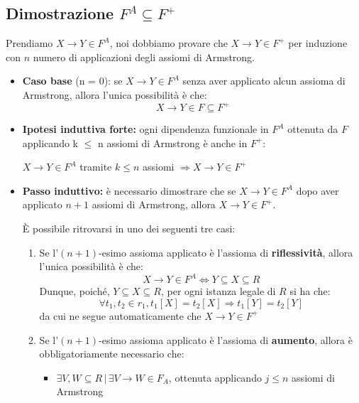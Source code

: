 \documentclass{article}
\begin{document}
\subsection{Dimostrazione $F^{A} \subseteq F^{+}$}
Prendiamo $X \rightarrow Y \in F^{A}$, noi dobbiamo provare che $X \rightarrow Y \in F^{+}$ per induzione con $n$ numero di applicazioni degli assiomi di Armstrong.
\begin{itemize}
  \item \textbf{Caso base} (n = 0): se $X \rightarrow Y \in F^{A}$ senza aver applicato alcun assioma di Armstrong, allora l'unica possibilità è che:
  \begin{equation}
    X \rightarrow Y \in F \subseteq F^{+}
  \end{equation}
  \item \textbf{Ipotesi induttiva forte:} ogni dipendenza funzionale in $F^{A}$ ottenuta da $F$
  applicando k $\leq$ n assiomi di Armstrong è anche in $F^{+}$:
  \begin{center}
    $X \rightarrow Y \in F^{A}$ tramite $k \leq n$ assiomi $\Rightarrow X \rightarrow Y \in F^{+}$
  \end{center}
  \item \textbf{Passo induttivo:} è necessario dimostrare che se $X \rightarrow Y \in F^{A}$ dopo aver applicato $n +1$ assiomi di Armstrong, allora $ X \rightarrow Y \in F^{+}$.\par
  È possibile ritrovarsi in uno dei seguenti tre casi:
  \begin{enumerate}
    \item Se l'$(n + 1)$-esimo assioma applicato è l'assioma di \textbf{riflessività}, allora l'unica possibilità è che:
    \begin{equation}
      X \rightarrow Y \in F^{A} \Leftrightarrow Y \subseteq X \subseteq R
    \end{equation}
    Dunque, poiché, $Y \subseteq X \subseteq R$, per ogni istanza legale di $R$ si ha che:
    \begin{equation}
      \forall t_1, t_2 \in r_{1}, t_1[X] = t_2[X] \Rightarrow t_1[Y] = t_2[Y]
    \end{equation}
    da cui ne segue automaticamente che $X \rightarrow Y \in F^{+}$
    \item Se l'$(n + 1)$-esimo assioma applicato è l'assioma di \textbf{aumento}, allora è obbligatoriamente necessario che:
    \begin{itemize}
      \item $\exists V, W \subseteq R \, | \, \exists V \rightarrow W \in F_{A}$, ottenuta applicando $j \leq n$ assiomi di Armstrong\\


\end{itemize}
\end{enumerate}
\end{itemize}
\end{document}
